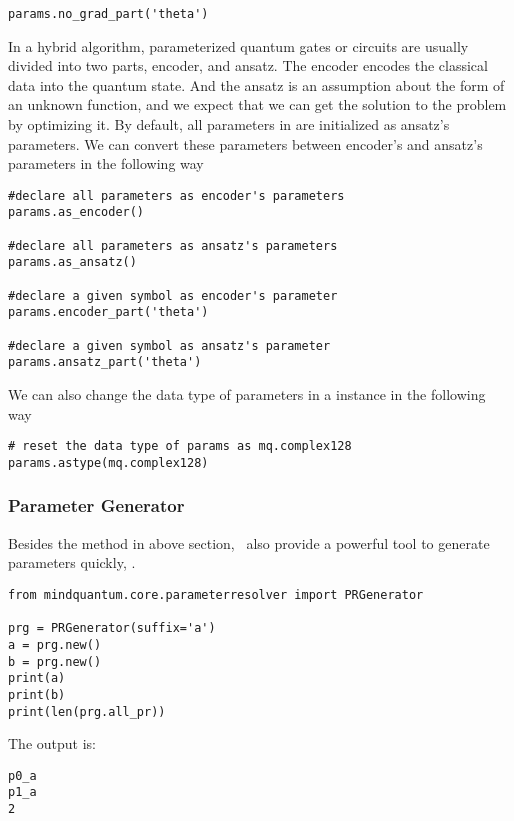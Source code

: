 \begin{lstlisting}
params.no_grad_part('theta')
\end{lstlisting}

In a hybrid algorithm, parameterized quantum gates or circuits are usually divided into two parts, encoder, and ansatz. The encoder encodes the classical data into the quantum state. And the ansatz is an assumption about the form of an unknown function, and we expect that we can get the solution to the problem by optimizing it. By default, all parameters in \ParameterResolver are initialized as ansatz's parameters. We can convert these parameters between encoder's and ansatz's parameters in the following way

\begin{lstlisting}
#declare all parameters as encoder's parameters
params.as_encoder()

#declare all parameters as ansatz's parameters
params.as_ansatz()

#declare a given symbol as encoder's parameter
params.encoder_part('theta')

#declare a given symbol as ansatz's parameter
params.ansatz_part('theta')
\end{lstlisting}

We can also change the data type of parameters in a \ParameterResolver instance in the following way
\begin{lstlisting}
# reset the data type of params as mq.complex128
params.astype(mq.complex128)
\end{lstlisting}

\subsubsection{Parameter Generator}

Besides the method in above section, \MindQuantum\ also provide a powerful tool to generate parameters quickly, \PRGenerator.
\begin{lstlisting}
from mindquantum.core.parameterresolver import PRGenerator

prg = PRGenerator(suffix='a')
a = prg.new()
b = prg.new()
print(a)
print(b)
print(len(prg.all_pr))
\end{lstlisting}
The output is:
\begin{lstlisting}
p0_a
p1_a
2
\end{lstlisting}
